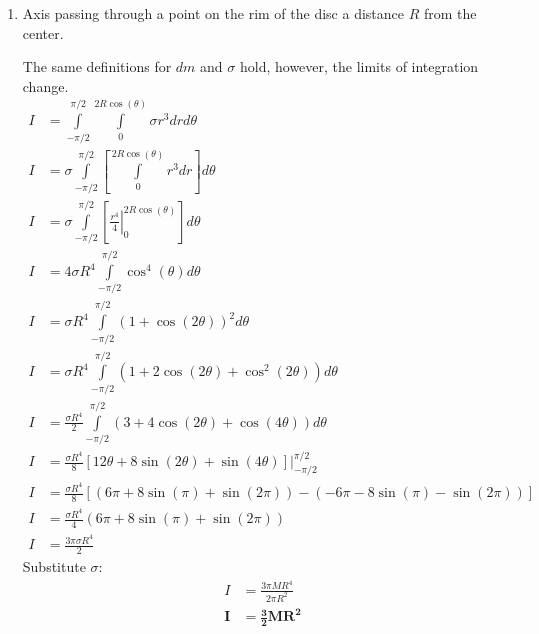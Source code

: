 \documentclass{article}
\begin{document}
\begin{enumerate}[i]
    \item Axis passing through a point on the rim of the disc a distance $R$
        from the center.
    \begin{figure}[H]
        \centering
    \end{figure}
    The same definitions for $dm$ and $\sigma$ hold, however, the limits of
    integration change.
    \begin{align*}
        I&=\int\limits_{-\pi/2}^{\pi/2}\int\limits_{0}^{2R\cos(\theta)}\sigma
        r^{3} drd\theta\\
        I&=\sigma\int\limits_{-\pi/2}^{\pi/2}\left[\int\limits_{0}^{2R\cos(\theta)}r^{3}
    dr\right]d\theta\\
        I&=\sigma\int\limits_{-\pi/2}^{\pi/2}\left[\left.\frac{r^{4}}{4}\right\vert^{2R\cos(\theta)}_{0}\right]d\theta\\
        I&=4\sigma R^4\int\limits_{-\pi/2}^{\pi/2}\cos^{4}(\theta)d\theta\\
        I&=\sigma R^4\int\limits_{-\pi/2}^{\pi/2}(1+\cos(2\theta))^{2}d\theta\\
        I&=\sigma R^4\int\limits_{-\pi/2}^{\pi/2}(1+2\cos(2\theta)+\cos^{2}(2\theta))d\theta\\
        I&=\frac{\sigma R^4}{2}\int\limits_{-\pi/2}^{\pi/2}(3+4\cos(2\theta)+\cos(4\theta))d\theta\\
        I&=\frac{\sigma
R^4}{8}\left.\left[12\theta+8\sin(2\theta)+\sin(4\theta)\right]\right\vert^{\pi/2}_{-\pi/2}\\
        I&=\frac{\sigma
        R^4}{8}\left[\left(6\pi+8\sin(\pi)+\sin(2\pi)\right)-\left(-6\pi-8\sin(\pi)-\sin(2\pi)\right)\right]\\
        I&=\frac{\sigma R^4}{4}\left(6\pi+8\sin(\pi)+\sin(2\pi)\right)\\
        I&=\frac{3\pi\sigma R^4}{2}
    \end{align*}
    Substitute $\sigma$:
    \begin{align*}
        I&=\frac{3\pi M R^4}{2\pi R^{2}}\\
        \bm{I}&\bm{=\frac{3}{2} M R^2}
    \end{align*}
    
\end{enumerate}
\end{document}

